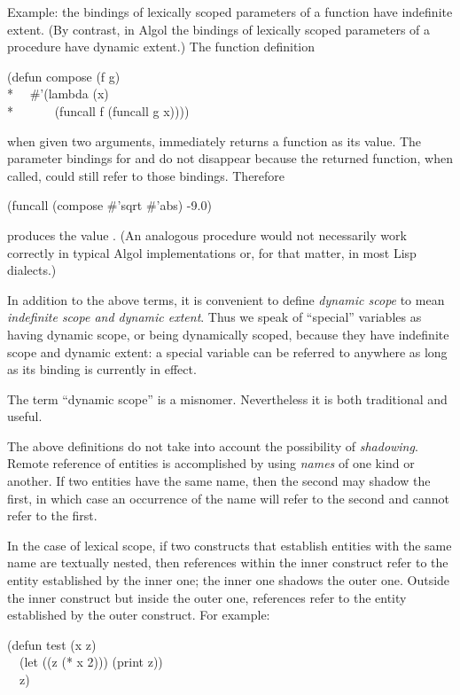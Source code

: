 \begin{itemize}
Example: the bindings of lexically scoped parameters of a function have
indefinite extent.  (By contrast, in Algol the bindings of lexically scoped
parameters of a procedure have dynamic extent.)
The function definition
\begin{lisp}
(defun compose (f g) \\*
~~\#'(lambda (x) \\*
~~~~~~(funcall f (funcall g x))))
\end{lisp}
when given two arguments, immediately returns a function as its value.
The parameter bindings for  and  do not disappear because the
returned function, when called, could still refer to those bindings.
Therefore
\begin{lisp}
(funcall (compose \#'sqrt \#'abs) -9.0)
\end{lisp}
produces the value .  (An analogous procedure would not necessarily work
correctly in typical Algol implementations or, for that matter,
in most Lisp dialects.)
\end{itemize}

In addition to the above terms, it is convenient to define \emph{dynamic scope}
to mean \emph{indefinite scope and dynamic extent}.  Thus we speak of
``special'' variables as having dynamic scope, or being dynamically scoped,
because they have indefinite scope and dynamic extent: a special variable
can be referred to anywhere as long as its binding is currently
in effect.

\begin{newer}
The term ``dynamic scope'' is a misnomer.  Nevertheless
it is both traditional and useful.
\end{newer}

The above definitions do not take into account the possibility of
\emph{shadowing}.  Remote reference of entities is accomplished by using
\emph{names} of one kind or another.  If two entities have the same name,
then the second may shadow the first, in which case an occurrence
of the name will refer to the second and cannot refer to the first.

In the case of lexical scope,
if two constructs that establish entities
with the same name are textually nested, then references within the inner
construct refer to the entity established by the inner one; the inner one
shadows the outer one.  Outside the inner construct but inside the outer one,
references refer to the entity established by the outer construct.
For example:

\begin{lisp}
(defun test (x z) \\
~~(let ((z (* x 2))) (print z)) \\
~~z)
\end{lisp}

